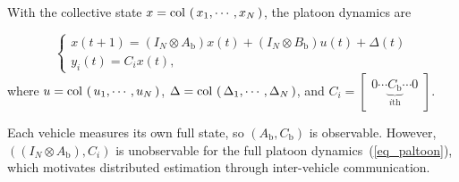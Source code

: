 \documentclass{ifacconf}
\def\col#1{\mathop{{\rm col}\,\left(\,#1\,\right)}}
\def\eqref#1{(\ref{#1})}
\newtheorem{assumption}{\it \textbf{Assumption}}%
\begin{document}
With the collective state $x = \col{x_{1}, \cdots , x_{N}}$, the platoon dynamics are

\begin{equation}\label{eq_paltoon}
      \left\{ \begin{array}{l}
      x(t+1) = (I_N \otimes A_{\text{b}}) x(t) + (I_N \otimes B_{\text{b}}) u(t) + \Delta (t)\\
      y_i(t) = C_i x(t),
      \end{array}\right.
\end{equation}
where $u = \col{u_{1}, \cdots , u_{N}}$, $\Delta = \col{\Delta_1, \cdots, \Delta_N}$, and $C_i = \begin{bmatrix}0 \cdots \underbrace{C_{\text{b}}}_{i\text{th}} \cdots 0\end{bmatrix}$.

Each vehicle measures its own full state, so $(A_{\text{b}}, C_{\text{b}})$ is observable. However, $((I_N \otimes A_{\text{b}}), C_i)$ is unobservable for the full platoon dynamics~\eqref{eq_paltoon}, which motivates distributed estimation through inter-vehicle communication.

\end{document}
